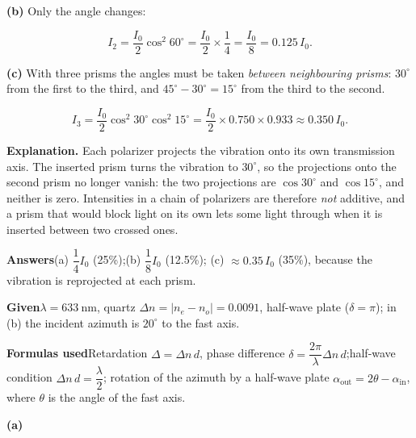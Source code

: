 \documentclass[11pt]{ctexart}
\let\subhdrtheme\subhdr
\renewcommand{\subhdr}[1]{\needspace{3\baselineskip}\subhdrtheme{#1}}
\begin{document}
\textbf{(b)} Only the angle changes:

\[
I_2=\frac{I_0}{2}\cos^2 60^\circ=\frac{I_0}{2}\times\frac14=\frac{I_0}{8}=0.125\,I_0 .
\]

\textbf{(c)} With three prisms the angles must be taken \emph{between neighbouring prisms}:
$30^\circ$ from the first to the third, and $45^\circ-30^\circ=15^\circ$ from the third to the second.

\[
I_3=\frac{I_0}{2}\cos^2 30^\circ\cos^2 15^\circ
=\frac{I_0}{2}\times0.750\times0.933\approx0.350\,I_0 .
\]

\textbf{Explanation.} Each polarizer projects the vibration onto its own transmission axis. The inserted prism
turns the vibration to $30^\circ$, so the projections onto the second prism no longer vanish: the two
projections are $\cos 30^\circ$ and $\cos 15^\circ$, and neither is zero. Intensities in a chain of
polarizers are therefore \emph{not} additive, and a prism that would block light on its own lets some
light through when it is inserted between two crossed ones.

\textbf{Answers}\quad (a) $\dfrac{1}{4}I_0$ (25\%);\quad (b) $\dfrac{1}{8}I_0$ (12.5\%);\quad
(c) $\approx0.35\,I_0$ (35\%), because the vibration is reprojected at each prism.



\textbf{Given}\quad $\lambda=633\ \mathrm{nm}$, quartz $\Delta n=|n_e-n_o|=0.0091$, half-wave plate
($\delta=\pi$); in (b) the incident azimuth is $20^\circ$ to the fast axis.

\textbf{Formulas used}\quad Retardation $\Delta=\Delta n\,d$, phase difference
$\delta=\dfrac{2\pi}{\lambda}\Delta n\,d$;\quad half-wave condition $\Delta n\,d=\dfrac{\lambda}{2}$;\quad
rotation of the azimuth by a half-wave plate $\alpha_{\text{out}}=2\theta-\alpha_{\text{in}}$, where
$\theta$ is the angle of the fast axis.

\textbf{(a)}
\end{document}
